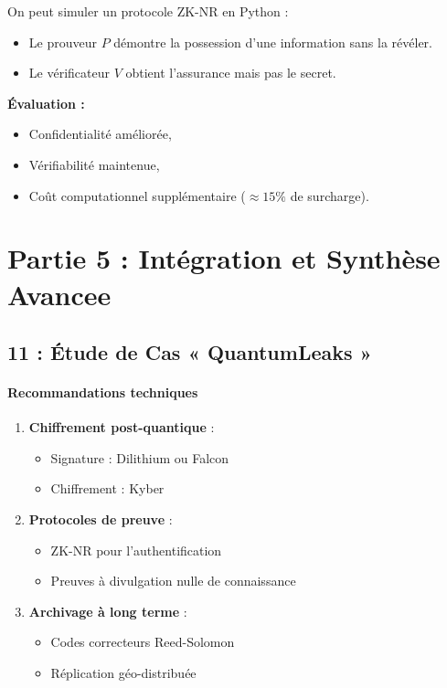\documentclass[12pt,a4paper]{article}
\begin{document}
	 On peut simuler un protocole ZK-NR en Python :
	 \begin{itemize}
	 	\item Le prouveur \(P\) démontre la possession d'une information sans la révéler.
	 	\item Le vérificateur \(V\) obtient l'assurance mais pas le secret.
	 \end{itemize}
	 
	 \textbf{Évaluation :}
	 \begin{itemize}
	 	\item Confidentialité améliorée,
	 	\item Vérifiabilité maintenue,
	 	\item Coût computationnel supplémentaire (\( \approx 15\%\) de surcharge).
	 \end{itemize}
	 \section*{Partie 5 : Intégration et Synthèse Avancee}
	 
	 \subsection*{11 : Étude de Cas « QuantumLeaks »}
	 
	 \paragraph{Recommandations techniques}
	 \begin{enumerate}
	 	\item \textbf{Chiffrement post-quantique} :
	 	\begin{itemize}
	 		\item Signature : Dilithium ou Falcon
	 		\item Chiffrement : Kyber
	 	\end{itemize}
	 	
	 	\item \textbf{Protocoles de preuve} :
	 	\begin{itemize}
	 		\item ZK-NR pour l'authentification
	 		\item Preuves à divulgation nulle de connaissance
	 	\end{itemize}
	 	
	 	\item \textbf{Archivage à long terme} :
	 	\begin{itemize}
	 		\item Codes correcteurs Reed-Solomon
	 		\item Réplication géo-distribuée
	 	\end{itemize}
	 \end{enumerate}
	 
\end{document}
